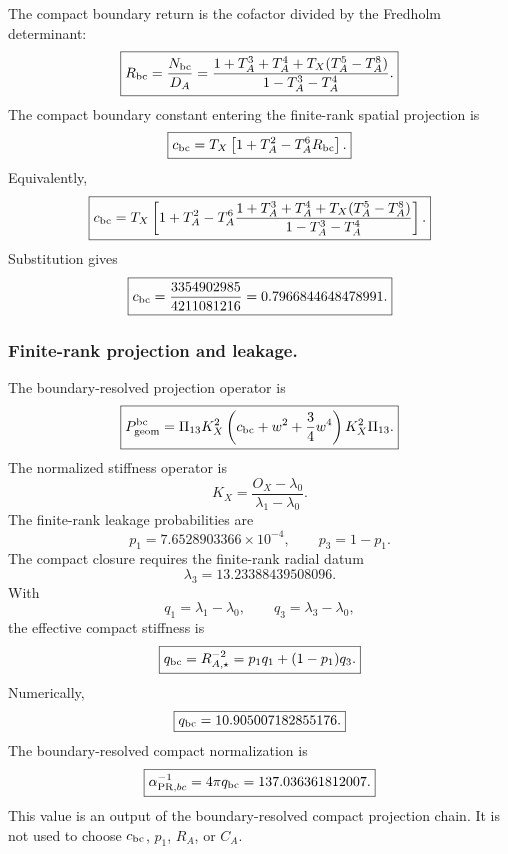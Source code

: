 \documentclass[11pt]{article}
\begin{document}
The compact boundary return is the cofactor divided by the Fredholm determinant:
\begin{equation}
\boxed{
R_{\rm bc}
=
\frac{N_{\rm bc}}{D_A}
=
\frac{
1+T_A^3+T_A^4+T_X(T_A^5-T_A^8)
}{
1-T_A^3-T_A^4
}.
}
\end{equation}
The compact boundary constant entering the finite-rank spatial projection is
\begin{equation}
\boxed{
c_{\rm bc}
=
T_X
\left[
1+T_A^2
-
T_A^6R_{\rm bc}
\right].
}
\end{equation}
Equivalently,
\begin{equation}
\boxed{
c_{\rm bc}
=
T_X
\left[
1+T_A^2
-
T_A^6
\frac{
1+T_A^3+T_A^4+T_X(T_A^5-T_A^8)
}{
1-T_A^3-T_A^4
}
\right].
}
\end{equation}
Substitution gives
\begin{equation}
\boxed{
c_{\rm bc}
=
\frac{3354902985}{4211081216}
=
0.7966844648478991.
}
\end{equation}

\subsubsection{Finite-rank projection and leakage.}
\label{app:finite-rank-leakage}

The boundary-resolved projection operator is
\begin{equation}
\boxed{
P_{\rm geom}^{\rm bc}
=
\Pi_{13}K_X^2
\left(
c_{\rm bc}+w^2+\frac34w^4
\right)
K_X^2\Pi_{13}.
}
\end{equation}
The normalized stiffness operator is
\begin{equation}
\boxed{
K_X
=
\frac{O_X-\lambda_0}{\lambda_1-\lambda_0}.
}
\end{equation}
The finite-rank leakage probabilities are
\begin{equation}
\boxed{
p_1=7.6528903366\times10^{-4},
\qquad
p_3=1-p_1.
}
\end{equation}
The compact closure requires the finite-rank radial datum
\begin{equation}
\boxed{
\lambda_3
=
13.23388439508096.
}
\end{equation}
With
\begin{equation}
\boxed{
q_1=\lambda_1-\lambda_0,
\qquad
q_3=\lambda_3-\lambda_0,
}
\end{equation}
the effective compact stiffness is
\begin{equation}
\boxed{
q_{\rm bc}
=
R_{A,\star}^{-2}
=
p_1q_1+(1-p_1)q_3.
}
\end{equation}
Numerically,
\begin{equation}
\boxed{
q_{\rm bc}
=
10.905007182855176.
}
\end{equation}
The boundary-resolved compact normalization is
\begin{equation}
\boxed{
\alpha_{{\rm PR},bc}^{-1}
=
4\pi q_{\rm bc}
=
137.036361812007.
}
\end{equation}
This value is an output of the boundary-resolved compact projection chain. It is not used to choose \(c_{\rm bc}\), \(p_1\), \(R_A\), or \(C_A\).
\end{document}
